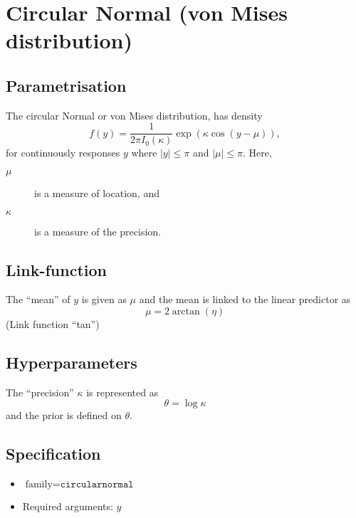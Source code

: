 \documentclass[a4paper,11pt]{article}
\begin{document}
\section*{Circular Normal (von Mises distribution)}

\subsection*{Parametrisation}

The circular Normal or von Mises distribution, has density
\begin{displaymath}
    f(y) = \frac{1}{2\pi  I_{0}(\kappa)} \exp(\kappa \cos(y-\mu)), 
\end{displaymath}
for continuously responses $y$ where
$|y| \le \pi$ and $|\mu| \le \pi$. Here, 
\begin{description}
\item[$\mu$] is a measure of location, and 
\item[$\kappa$] is a measure of the precision.
\end{description}

\subsection*{Link-function}

The ``mean'' of $y$ is given as $\mu$ and the mean is linked to the
linear predictor as
\begin{displaymath}
    \mu = 2\arctan(\eta)
\end{displaymath}
(Link function ``tan'')

\subsection*{Hyperparameters}

The ``precision'' $\kappa$ is represented as
\begin{displaymath}
    \theta = \log \kappa
\end{displaymath}
and the prior is defined on $\theta$. 

\subsection*{Specification}

\begin{itemize}
\item $\text{family}=\texttt{circularnormal}$
\item Required arguments: $y$
\end{itemize}
\end{document}
